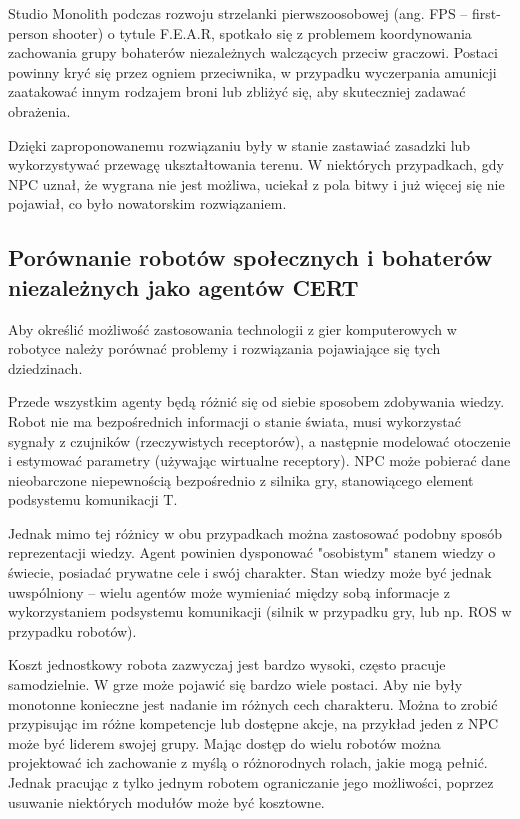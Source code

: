 Studio Monolith podczas rozwoju strzelanki pierwszoosobowej (ang. FPS – first-person shooter) o tytule F.E.A.R, spotkało się z problemem koordynowania zachowania grupy bohaterów niezależnych walczących przeciw graczowi. Postaci powinny kryć się przez ogniem przeciwnika, w przypadku wyczerpania amunicji zaatakować innym rodzajem broni lub zbliżyć się, aby skuteczniej zadawać obrażenia.

Dzięki zaproponowanemu rozwiązaniu były w stanie zastawiać zasadzki lub wykorzystywać przewagę ukształtowania terenu. W niektórych przypadkach, gdy NPC uznał, że wygrana nie jest możliwa, uciekał z pola bitwy i już więcej się nie pojawiał, co było nowatorskim rozwiązaniem.

\subsection{Porównanie robotów społecznych i bohaterów niezależnych jako agentów CERT}
Aby określić możliwość zastosowania technologii z gier komputerowych w robotyce należy porównać problemy i rozwiązania pojawiające się tych dziedzinach.

Przede wszystkim agenty będą różnić się od siebie sposobem zdobywania wiedzy. Robot nie ma bezpośrednich informacji o stanie świata, musi wykorzystać sygnały z czujników (rzeczywistych receptorów), a następnie modelować otoczenie i estymować parametry (używając wirtualne receptory). NPC może pobierać dane nieobarczone niepewnością bezpośrednio z silnika gry, stanowiącego element podsystemu komunikacji T. 

Jednak mimo tej różnicy w obu przypadkach można zastosować podobny sposób reprezentacji wiedzy. Agent powinien dysponować "osobistym" stanem wiedzy o świecie, posiadać prywatne cele i swój charakter. Stan wiedzy może być jednak uwspólniony – wielu agentów może wymieniać między sobą informacje z wykorzystaniem podsystemu komunikacji (silnik w przypadku gry, lub np. ROS w przypadku robotów).

Koszt jednostkowy robota zazwyczaj jest bardzo wysoki, często pracuje samodzielnie. W grze może pojawić się bardzo wiele postaci. Aby nie były monotonne konieczne jest nadanie im różnych cech charakteru. Można to zrobić przypisując im różne kompetencje lub dostępne akcje, na przykład jeden z NPC może być liderem swojej grupy. Mając dostęp do wielu robotów można projektować ich zachowanie z myślą o różnorodnych rolach, jakie mogą pełnić. Jednak pracując z tylko jednym robotem ograniczanie jego możliwości, poprzez usuwanie niektórych modułów może być kosztowne.

